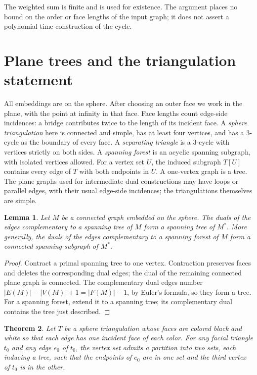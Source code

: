 \documentclass[11pt]{article}
\newtheorem{theorem}{Theorem}[section]
\newtheorem{lemma}[theorem]{Lemma}
\theoremstyle{remark}
\newcommand{\abs}[1]{\left|#1\right|}
\numberwithin{equation}{section}
\begin{document}
The weighted sum is finite and is used for existence. The argument
places no bound on the order or face lengths of the input graph;
it does not assert a polynomial-time construction of the cycle.

\section{Plane trees and the triangulation statement}\label{sec:setup}

All embeddings are on the sphere. After choosing an outer face
we work in the plane, with the point at infinity in that face.
Face lengths count edge-side incidences: a bridge contributes
twice to the length of its incident face. A \emph{sphere
triangulation} here is connected and simple, has at least four
vertices, and has a \(3\)-cycle as the boundary of every face.
A \emph{separating triangle} is a \(3\)-cycle with vertices strictly
on both sides.
A \emph{spanning forest} is an acyclic spanning subgraph, with
isolated vertices allowed. For a vertex set \(U\), the induced subgraph
\(T[U]\) contains every edge of \(T\) with both endpoints in \(U\).
A one-vertex graph is a tree. The plane graphs used for intermediate
dual constructions may have loops or parallel edges, with their usual
edge-side incidences; the triangulations themselves are simple.

\begin{lemma}\label{lem:duality}
Let \(M\) be a connected graph embedded on the sphere.
The duals of the edges complementary to a spanning tree of \(M\)
form a spanning tree of \(M^*\). More generally, the duals of the
edges complementary to a spanning forest of \(M\) form a
connected spanning subgraph of \(M^*\).
\end{lemma}

\begin{proof}
Contract a primal spanning tree to one vertex. Contraction
preserves faces and deletes the corresponding dual edges; the
dual of the remaining connected plane graph is connected.
The complementary dual edges number
\(\abs{E(M)}-\abs{V(M)}+1=\abs{F(M)}-1\), by Euler's formula,
so they form a tree. For a spanning forest, extend it to a
spanning tree; its complementary dual contains the tree just
described.
\end{proof}

\begin{theorem}\label{thm:partition}
Let \(T\) be a sphere triangulation whose faces are colored black
and white so that each edge has one incident face of each color.
For any facial triangle \(t_0\) and any edge \(e_0\) of \(t_0\),
the vertex set admits a partition into two sets, each inducing
a tree, such that the endpoints of \(e_0\) are in one set and
the third vertex of \(t_0\) is in the other.
\end{theorem}
\end{document}
